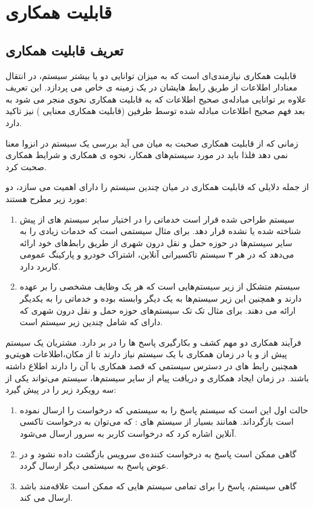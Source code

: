 \chapter{قابلیت همکاری}
\section{تعریف قابلیت همکاری}
قابلیت همکاری  نیازمندی‌ای است که به میزان توانایی دو یا بیشتر سیستم، در انتقال معنادار اطلاعات از طریق رابط  هایشان در یک زمینه ی خاص می پردازد.
این تعریف علاوه بر توانایی مبادله‌ی صحیح اطلاعات که به قابلیت همکاری نحوی  منجر می شود به بعد فهم صحیح اطلاعات مبادله شده توسط طرفین (قابلیت همکاری معنایی  ) نیز تاکید دارد.

زمانی که از قابلیت همکاری صحبت به میان می آید بررسی یک سیستم در انزوا معنا نمی دهد فلذا باید در مورد سیستم‌های همکار، نحوه ی همکاری و شرایط همکاری صحبت کرد.

از جمله دلایلی که قابلیت همکاری در میان چندین سیستم را دارای اهمیت می سازد،‌ دو مورد زیر مطرح هستند:
\begin{enumerate}
\item
سیستم طراحی شده قرار است خدماتی را در اختیار سایر سیستم های از پیش شناخته شده یا نشده قرار دهد. برای مثال  سیستمی است که خدمات زیادی را به سایر سیستم‌ها در حوزه حمل و نقل درون شهری از طریق رابط‌های خود ارائه می‌دهد که در هر ۳ سیستم تاکسیرانی آنلاین، اشتراک خودرو و پارکینگ عمومی کاربرد دارد.
\item
سیستم متشکل از زیر سیستم‌هایی است که هر یک وظایف مشخصی را بر عهده دارند و همچنین این زیر سیستم‌ها به یک دیگر وابسته بوده و خدماتی را به یکدیگر ارائه می دهند. برای مثال تک تک سیستم‌های حوزه حمل و نقل درون شهری که دارای که شامل چندین زیر سیستم است.
\end{enumerate}

فرآیند همکاری دو مهم کشف و بکارگیری پاسخ ها  را در بر دارد. مشتریان یک سیستم پیش از و یا در زمان همکاری با یک سیستم نیاز دارند تا از مکان‌،اطلاعات هویتی‌و همچنین رابط های در دسترس سیستمی که قصد همکاری با آن را دارند اطلاع داشته باشند. در زمان ایجاد همکاری و دریافت پیام از سایر سیستم‌ها، سیستم می‌تواند یکی از سه رویکرد زیر را در پیش گیرد:
\begin{enumerate}
\item
حالت اول این است که سیستم پاسخ را به سیستمی که درخواست را ارسال نموده است بازگرداند. همانند بسیار از سیستم های  : که می‌توان به درخواست تاکسی آنلاین اشاره کرد که درخواست کاربر به سرور ارسال می‌شود.
\item
گاهی ممکن است پاسخ به درخواست کننده‌ی سرویس بازگشت داده نشود و در عوض پاسخ به سیستمی دیگر ارسال گردد.
\item
گاهی سیستم، پاسخ را برای تمامی سیستم هایی که ممکن است علاقه‌مند باشد ارسال می کند.
\end{enumerate}

